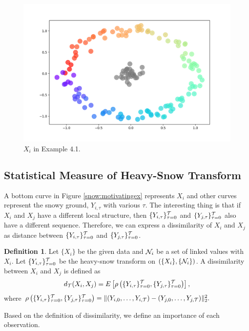 \documentclass[preprint, review, 12pt]{article}
\theoremstyle{definition}
\newtheorem{dfn}{Definition}
\theoremstyle{remark}
\begin{document}
\begin{figure}
	\centering
	\includegraphics[width=1\textwidth]{Fig/Ex2.png}
	\caption{$X_i$ in Example 4.1.} 
\end{figure}


\iffalse
\subsection{Statistical Measure of Heavy-Snow Transform}

A bottom curve in Figure \ref{snow:motivatingex} represents $X_i$ and other curves represent the snowy ground, $Y_{i,\tau}$ with various $\tau$. The interesting thing is that if $X_i$ and $X_j$ have a different local structure, then $\{Y_{i,\tau}\}_{\tau=0}^{\cal T}$ and $\{Y_{j,\tau}\}_{\tau=0}^{\cal T}$ also have a different sequence. Therefore, we can express a dissimilarity of $X_i$ and $X_j$ as distance between $\{Y_{i,\tau}\}_{\tau=0}^{\cal T}$ and $\{Y_{j,\tau}\}_{\tau=0}^{\cal T}$.

\begin{dfn}
	Let $\{X_i\}$ be the given data and ${\cal N}_{i}$ be a set of linked values with $X_i$. Let  $\{Y_{i,\tau}\}_{\tau=0}^{\cal T}$ be the heavy-snow transform on $(\{X_i\},\{{\cal N}_i\})$. A dissimilarity between $X_i$ and $X_j$ is defined as
	\[
	d_{\cal T}(X_i,X_j)=E\left[\rho\left(\{Y_{i,\tau}\}_{\tau=0}^{\cal T},\{Y_{j,\tau}\}_{\tau=0}^{\cal T}\right)\right], 
	\]
	where $\rho\left(\{Y_{i,\tau}\}_{\tau=0}^{\cal T},\{Y_{j,\tau}\}_{\tau=0}^{\cal T}\right)=\|(Y_{i,0},\dots,Y_{i,{\cal T}})-(Y_{j,0},\dots,Y_{j,{\cal T}}) \|_2^2.$
\end{dfn}

Based on the definition of dissimilarity, we define an importance of each observation.
\end{document}
